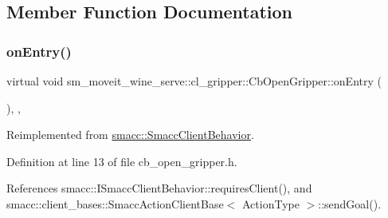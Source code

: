 \subsection{Member Function Documentation}
\mbox{\label{classsm__moveit__wine__serve_1_1cl__gripper_1_1CbOpenGripper_aa54be14caa3617182da50f7ad5541ed4}} 
\subsubsection{\texorpdfstring{on\+Entry()}{onEntry()}}
{\footnotesize\ttfamily virtual void sm\+\_\+moveit\+\_\+wine\+\_\+serve\+::cl\+\_\+gripper\+::\+Cb\+Open\+Gripper\+::on\+Entry (\begin{DoxyParamCaption}{ }\end{DoxyParamCaption})\hspace{0.3cm}{\ttfamily [inline]}, {\ttfamily [override]}, {\ttfamily [virtual]}}



Reimplemented from \hyperlink{classsmacc_1_1SmaccClientBehavior_ad5d3e1f1697c3cfe66c94cadba948493}{smacc\+::\+Smacc\+Client\+Behavior}.



Definition at line 13 of file cb\+\_\+open\+\_\+gripper.\+h.



References smacc\+::\+I\+Smacc\+Client\+Behavior\+::requires\+Client(), and smacc\+::client\+\_\+bases\+::\+Smacc\+Action\+Client\+Base$<$ Action\+Type $>$\+::send\+Goal().



